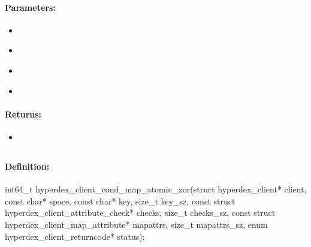 \paragraph{Parameters:}
\begin{itemize}[noitemsep]
\item {}\\

\item {}\\

\item {}\\

\item {}\\

\end{itemize}

\paragraph{Returns:}
\begin{itemize}[noitemsep]
\item {}\\

\end{itemize}

\pagebreak
\subsection{}
\label{api:c:cond_map_atomic_xor}


\paragraph{Definition:}
\begin{ccode}
int64_t hyperdex_client_cond_map_atomic_xor(struct hyperdex_client* client,
        const char* space,
        const char* key, size_t key_sz,
        const struct hyperdex_client_attribute_check* checks, size_t checks_sz,
        const struct hyperdex_client_map_attribute* mapattrs, size_t mapattrs_sz,
        enum hyperdex_client_returncode* status);
\end{ccode}


